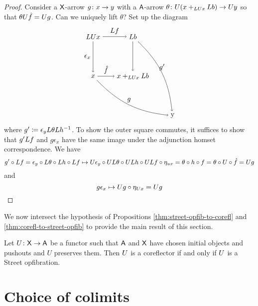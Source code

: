 \documentclass{amsart}
\begin{document}
\begin{proof}
  Consider a $ \mathsf{X} $-arrow $ g \colon x \to y $
  with a $ \mathsf{A} $-arrow
  $ \theta \colon U( x +_{LU x} L b ) \to U y $ so
  that $ \theta U \hat{f} = U g $.  Can we
  uniquely lift $ \theta $? Set up the diagram
  \[
    \begin{tikzpicture}
      \node (ul) at (0,2) {$ \L\U x $};
      \node (ll) at (0,0) {$ x $};
      \node (ur) at (2,2) {$ \L b $};
      \node (lr) at (2,0) {$ x +_{\L\U x} \L b$};
      \node (comp) at (4,-2) {y};
      \draw [->] (ul) to node [left] {$ \epsilon_x $} (ll);
      \draw [->] (ul) to node [above] {$ \L f $} (ur);
      \draw [->] (ll) to node [above] {$ \hat{f} $} (lr);
      \draw [->] (ur) to (lr);
      \draw [->] (ll) to [bend right=20] node [above] {$ g $} (comp);
      \draw [->] (ur) to [bend left=20] node [above] {$ g' $} (comp);
    \end{tikzpicture}
  \] 
  where $ g' \coloneqq \epsilon_y L\theta L h^{-1} $.
  To show the outer square commutes, it suffices
  to show that $ g' L f $ and $ g \epsilon_x $
  have the same image under the adjunction homset
  correspondence.  We have
  \[
    g' \circ L f =
    \epsilon_y \circ L\theta \circ L h \circ L f
    \mapsto
    U\epsilon_y \circ UL\theta \circ UL h
      \circ UL f \circ\eta_{ux}
    = \theta \circ h \circ f   
    = \theta \circ U \circ \hat{f} 
    = U g
  \]
  and 
  \[
    g \epsilon_x
    \mapsto
    U g \circ \eta_{U x}
    = U g
  \]
\end{proof}

We now intersect the hypothesis of Propositions
\cref{thm:street-opfib-to-corefl} and
\cref{thm:corefl-to-street-opfib} to provide the
main result of this section.

\begin{thm}
  \label{thm:main-theorem-street-version}
  Let $ U \colon \mathsf{X} \to \mathsf{A} $ be a functor such that $ \mathsf{A} $
  and $ \mathsf{X} $ have chosen initial objects and pushouts and
  $ U $ preserves them. Then $ U $ is a coreflector if and
  only if $ U $ is a Street opfibration.
\end{thm}





\appendix{}

\section{Choice of colimits}
\end{document}

